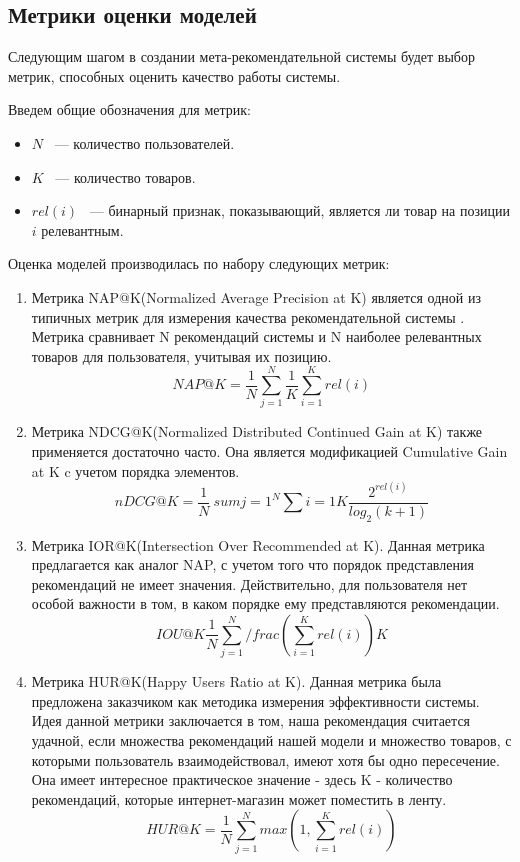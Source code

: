 \documentclass[14pt]{mmcs_article}
\begin{document}
\subsection{Метрики оценки моделей}
Следующим шагом в создании мета-рекомендательной системы будет выбор метрик, способных оценить качество работы системы.

Введем общие обозначения для метрик:
\begin{itemize}
	\item $N$  ~--- количество пользователей.
	\item $K$  ~--- количество товаров.
	\item $rel(i)$ ~--- бинарный признак, показывающий, является ли товар на позиции $i$ релевантным.
\end{itemize}


Оценка моделей производилась по набору следующих метрик:
\begin{enumerate}
	\item Метрика NAP@K(Normalized Average Precision at K) является одной из типичных метрик для измерения качества рекомендательной системы \cite{stud:kimfalk1}. Метрика сравнивает N рекомендаций системы и N наиболее релевантных товаров для пользователя, учитывая их позицию. 
	\begin{equation}
		NAP@K = \frac{1}{N} \sum_{j=1}^{N} \frac{1}{K}\sum_{i=1}^{K}rel(i)
	\end{equation}
	\item Метрика NDCG@K(Normalized Distributed Continued Gain at K) также применяется достаточно часто. Она является модификацией Cumulative Gain at K c учетом порядка элементов.
	\begin{equation}
		nDCG@K= \frac{1}{N} \ sum{j=1}^N \sum{i=1}{K} \frac{2^{rel(i)} }{log_2(k+1)} 	
    \end{equation}   
	\item Метрика IOR@K(Intersection Over Recommended at K). Данная метрика предлагается как аналог NAP, с учетом того что порядок представления рекомендаций не имеет значения. Действительно, для пользователя нет особой важности в том, в каком порядке ему представляются рекомендации.
	\begin{equation}
		IOU@K \frac{1}{N} \sum_{j=1}^N  /frac{(\sum_{i=1}^{K} rel(i))}{K} 
	\end{equation} 
	\item Метрика HUR@K(Happy Users Ratio at K). Данная метрика была предложена заказчиком как методика измерения эффективности системы. Идея данной метрики заключается в том, наша рекомендация считается удачной, если множества рекомендаций нашей модели и множество товаров, с которыми пользователь взаимодействовал,  имеют хотя бы одно пересечение. Она имеет интересное практическое значение - здесь K - количество рекомендаций, которые интернет-магазин может поместить в ленту.
	\begin{equation}
	   HUR@K = \frac{1}{N}\sum_{j=1}^{N} max(1,\sum_{i=1}^{K} rel(i)) 		
	\end{equation}
\end{enumerate}
\end{document}
